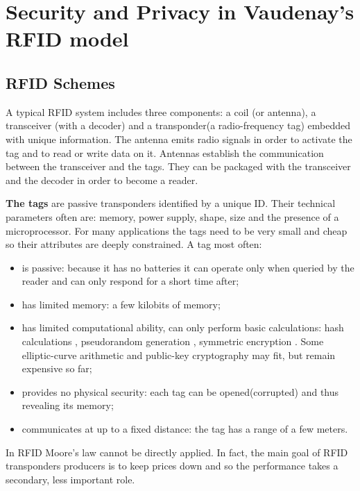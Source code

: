 \chapter{Security and Privacy in Vaudenay's RFID model}

\section{RFID Schemes}

        A typical RFID system includes three components: a coil (or antenna), a transceiver (with a decoder) and a
    transponder(a radio-frequency tag) embedded with unique information. The antenna emits radio signals in order to activate the tag and 
    to read or write data on it. Antennas establish the communication between the transceiver and the tags. They can be packaged with 
    the transceiver and the decoder in order to become a reader. 

        \textbf{The tags} are passive transponders identified by a unique ID. Their technical parameters often are: memory, power supply, shape, size and the presence of a 
    microprocessor. For many applications the tags need to be very small and cheap so their attributes are deeply constrained. A tag most often:
    \begin{itemize}
        \item is passive: because it has no batteries it can operate only when queried by the reader and can only respond for a short time after;
        \item has limited memory: a few kilobits of memory;
        \item has limited computational ability, can only perform basic calculations: hash calculations \cite{Feldhofer}, pseudorandom generation \cite{Robshaw}, 
        symmetric encryption \cite{Feldhofer2}. Some elliptic-curve arithmetic and public-key cryptography may fit, but remain expensive so far;
        \item provides no physical security: each tag can be opened(corrupted) and thus revealing its memory;
        \item communicates at up to a fixed distance: the tag has a range of a few meters.
    \end{itemize}
    
    In RFID Moore's law cannot be directly applied. In fact, the main goal of RFID transponders producers is to keep prices down and so the performance takes
    a secondary, less important role.

